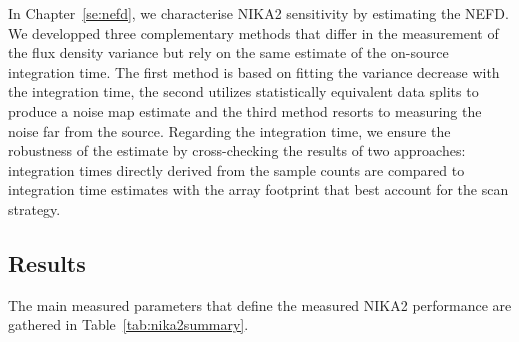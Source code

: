In Chapter~\ref{se:nefd}, we characterise NIKA2 sensitivity by
estimating the NEFD. We developped three complementary methods that
differ in the measurement of the flux density variance but rely on the
same estimate of the on-source integration time. The first method is
based on fitting the variance decrease with the integration time, the
second utilizes statistically equivalent data splits to produce a
noise map estimate and the third method resorts to measuring the noise
far from the source. Regarding the integration time, we ensure the
robustness of the estimate by cross-checking the results of two
approaches: integration times directly derived from the sample counts
are compared to integration time estimates with the array footprint
that best account for the scan strategy.  



\subsection*{Results}
The main measured parameters that define the measured NIKA2 performance
are gathered in Table~\ref{tab:nika2summary}.

